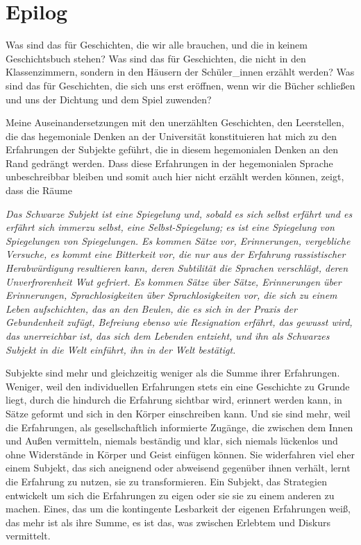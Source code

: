 \section{Epilog}
Was sind das für Geschichten, die wir alle brauchen, und die in
keinem Geschichtsbuch stehen? Was sind das für Geschichten, die nicht in den
Klassenzimmern, sondern in den Häusern der Schüler\_innen erzählt werden? Was
sind das für Geschichten, die sich uns erst eröffnen, wenn wir die Bücher
schließen und uns der Dichtung und dem Spiel zuwenden?

Meine Auseinandersetzungen mit den unerzählten Geschichten, den Leerstellen, die
das hegemoniale Denken an der Universität konstituieren hat mich zu den
Erfahrungen der Subjekte geführt, die in diesem hegemonialen Denken an den Rand
gedrängt werden. Dass diese Erfahrungen in der hegemonialen Sprache
unbeschreibbar bleiben und somit auch hier nicht erzählt werden  können, zeigt,
dass die Räume

\begin{myenv}
\textit{Das Schwarze Subjekt ist eine Spiegelung und, sobald es sich selbst erfährt und
es erfährt sich immerzu selbst, eine Selbst-Spiegelung; es ist eine Spiegelung
von Spiegelungen von Spiegelungen. Es kommen Sätze vor, Erinnerungen,
vergebliche Versuche, es kommt eine Bitterkeit vor, die nur aus der Erfahrung
rassistischer Herabwürdigung resultieren kann, deren Subtilität die Sprachen
verschlägt, deren Unverfrorenheit Wut gefriert. Es kommen Sätze über Sätze,
Erinnerungen über Erinnerungen, Sprachlosigkeiten über Sprachlosigkeiten vor,
die sich zu einem Leben aufschichten, das an den Beulen, die es sich in der
Praxis der Gebundenheit zufügt, Befreiung ebenso wie Resignation erfährt, das
gewusst wird, das unerreichbar ist, das sich dem Lebenden entzieht, und ihn als
Schwarzes Subjekt in die Welt einführt, ihn in der Welt bestätigt.\footnotemark
{}}
\end{myenv}

Subjekte sind mehr und gleichzeitig weniger als die Summe ihrer Erfahrungen.
Weniger, weil den individuellen Erfahrungen stets ein eine Geschichte zu Grunde
liegt, durch die hindurch die Erfahrung sichtbar wird, erinnert werden kann, in
Sätze geformt und sich in den Körper einschreiben kann. Und sie sind mehr, weil
die Erfahrungen, als gesellschaftlich informierte Zugänge, die zwischen dem
Innen und Außen vermitteln, niemals beständig und klar, sich niemals lückenlos
und ohne Widerstände in Körper und Geist einfügen können. Sie widerfahren viel
eher einem Subjekt, das sich aneignend oder abweisend gegenüber ihnen verhält,
lernt die Erfahrung zu nutzen, sie zu transformieren. Ein Subjekt, das
Strategien entwickelt um sich die Erfahrungen zu eigen oder sie sie zu einem
anderen zu machen. Eines, das um die kontingente Lesbarkeit der eigenen
Erfahrungen weiß, das mehr ist als ihre Summe, es ist das, was zwischen Erlebtem
und Diskurs vermittelt.
\\

